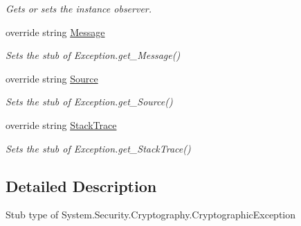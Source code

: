 \begin{DoxyCompactItemize}
\begin{DoxyCompactList}\small\item\em Gets or sets the instance observer.\end{DoxyCompactList}\item 
override string \hyperlink{class_system_1_1_security_1_1_cryptography_1_1_fakes_1_1_stub_cryptographic_exception_aec9ce402c51ca3e52743b6733e005c2c}{Message}
\begin{DoxyCompactList}\small\item\em Sets the stub of Exception.\-get\-\_\-\-Message()\end{DoxyCompactList}\item 
override string \hyperlink{class_system_1_1_security_1_1_cryptography_1_1_fakes_1_1_stub_cryptographic_exception_a31224a0aa8cdf9fb8fe5beebc94e13e8}{Source}
\begin{DoxyCompactList}\small\item\em Sets the stub of Exception.\-get\-\_\-\-Source()\end{DoxyCompactList}\item 
override string \hyperlink{class_system_1_1_security_1_1_cryptography_1_1_fakes_1_1_stub_cryptographic_exception_a2677c9eb88d698dcb7c256ede72fb8c5}{Stack\-Trace}
\begin{DoxyCompactList}\small\item\em Sets the stub of Exception.\-get\-\_\-\-Stack\-Trace()\end{DoxyCompactList}\end{DoxyCompactItemize}


\subsection{Detailed Description}
Stub type of System.\-Security.\-Cryptography.\-Cryptographic\-Exception




